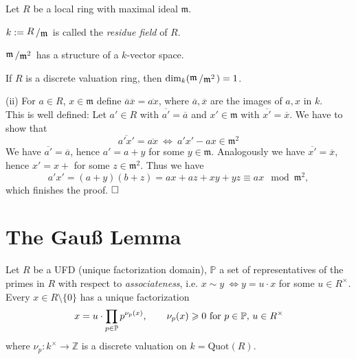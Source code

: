 \documentclass[11pt]{book}
\theoremstyle{nonumberbreak}
\newenvironment{pr}[1][]{\ifthenelse{\equal{#1}{}}{\proof}{\proof[#1]}\rm}{\endproof}
\newenvironment{definprop}[1][]{\ifthenelse{\equal{#1}{}}{\definiprop}{\definiprop[#1]}\rm}{\enddefiniprop}
\newcommand{\slant}[2]{{\raisebox{.1em}{$#1$}\left/\raisebox{-.1em}{$#2$}\right.}}
\begin{document}
\begin{spacing}{1.3}
\begin{definprop} %
Let $R$ be a local ring with maximal ideal $\mathfrak{m}$. 
\begin{compactenum}
\item $k:= \slant{R}{\mathfrak{m}}$ is called the \textit{residue field} of $R$.
\item $\slant{\mathfrak{m}}{\mathfrak{m}^2}$ has a structure of a $k$-vector space.
\item If $R$ is a discrete valuation ring, then $\dim_{k}(\slant{\mathfrak{m}}{\mathfrak{m}^2})=1$.
\end{compactenum}

\begin{pr}
\begin{compactenum}
\item[(ii)] For $a \in R$, $x \in \mathfrak{m}$ define $\overline{a} \overline{x}=\overline{ax}$, where $\overline{a}, \overline{x}$ are the images of $a,x$ in $k$.\\
This is well defined: Let $a' \in R$ with $\overline{a'}=\overline{a}$ and $x'\in \mathfrak{m}$ with $\overline{x'}=\overline{x}$. We have to show that $$\overline{a'x'}=\overline{ax} \ \Longleftrightarrow \ a'x' - ax \in \mathfrak{m}^2$$
We have $\overline{a'}=\overline{a}$, hence $a'=a+y$ for some $y \in \mathfrak{m}$. Analogously we have $\overline{x'}=\overline{x}$, hence $x'=x+$ for some $z \in \mathfrak{m}^2$. Thus we have
$$a'x'=(a+y)(b+z)=ax+az+xy+yz \equiv ax \mod \mathfrak{m}^2,$$
which finishes the proof. $\hfill \Box$
\end{compactenum}
\end{pr}
\end{definprop}



\renewcommand*\thesection{§ \arabic{section}\quad}
\section{The Gauß Lemma}
\renewcommand*\thesection{\arabic{section}}

Let $R$ be a UFD (unique factorization domain), $\mathbb{P}$ a set of representatives of the primes in $R$ with respect to \textit{associateness}, i.e. $x \sim y \ \Leftrightarrow y=u\cdot x$ for some $u \in R^{\times}$.
Every $x \in R\setminus \{0\}$ has a unique factorization 
$$x=u \cdot \prod_{p \in \mathbb{P}} p^{\nu_p(x)}, \qquad  \nu_p(x) \geqslant 0 \textrm{ for } p \in \mathbb{P} \textrm, \ u \in R^{\times} $$
where $\nu_p: k^{\times} \longrightarrow \mathbb{Z}$ is a discrete valuation on $k=\textrm{Quot}(R)$.


\end{spacing}
\end{document}
